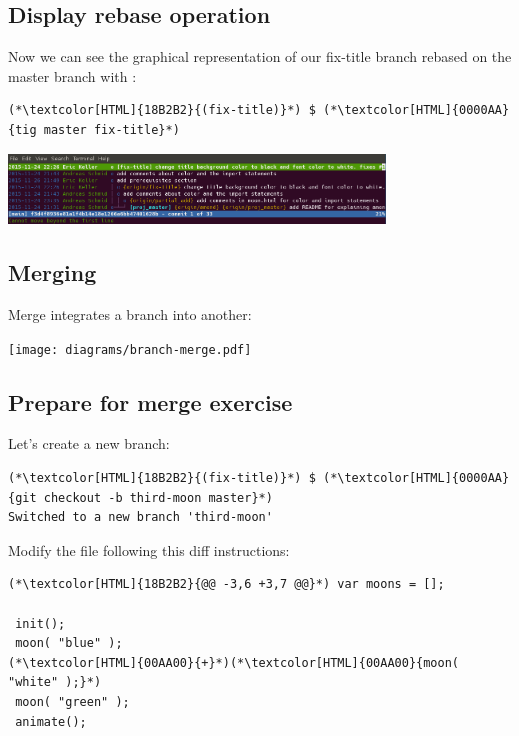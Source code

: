 \subsection{Display rebase operation}
\begin{frame}[fragile]
  \subslidetitle

  Now we can see the graphical representation of our fix-title branch rebased on the master branch with :
  \begin{lstlisting}
(*\textcolor[HTML]{18B2B2}{(fix-title)}*) $ (*\textcolor[HTML]{0000AA}{tig master fix-title}*)
\end{lstlisting}

  \vspace{1em}

  \centerline{\includegraphics[width=10cm]{../screen/tig-fix-title-rebase-master.png}}

\end{frame}

\subsection{Merging}
\begin{frame}[fragile]
  \subslidetitle
  Merge integrates a branch into another:
  \centerline{\texttt{[image: diagrams/branch-merge.pdf]}}
\end{frame}

\subsection{Prepare for merge exercise}
\begin{frame}[fragile]
  \subslidetitle

  Let's create a new  branch:
  \begin{lstlisting}
(*\textcolor[HTML]{18B2B2}{(fix-title)}*) $ (*\textcolor[HTML]{0000AA}{git checkout -b third-moon master}*)
Switched to a new branch 'third-moon'
\end{lstlisting}

  Modify the  file following this diff instructions:
  \begin{lstlisting}
(*\textcolor[HTML]{18B2B2}{@@ -3,6 +3,7 @@}*) var moons = [];

 init();
 moon( "blue" );
(*\textcolor[HTML]{00AA00}{+}*)(*\textcolor[HTML]{00AA00}{moon( "white" );}*)
 moon( "green" );
 animate();
\end{lstlisting}
\end{frame}

